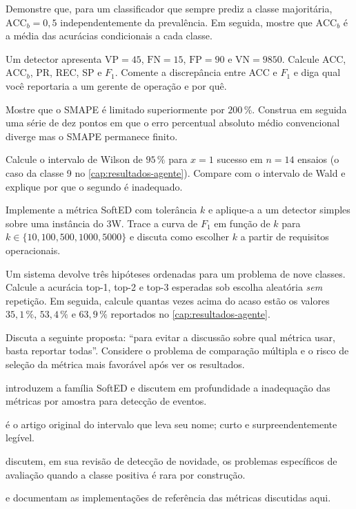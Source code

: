 \begin{exercicios}
\item Demonstre que, para um classificador que sempre prediz a classe majoritária,
      $\text{ACC}_b = 0{,}5$ independentemente da prevalência. Em seguida, mostre que
      $\text{ACC}_b$ é a média das acurácias condicionais a cada classe.

\item Um detector apresenta $\text{VP} = 45$, $\text{FN} = 15$, $\text{FP} = 90$ e
      $\text{VN} = \num{9850}$. Calcule ACC, $\text{ACC}_b$, PR, REC, SP e $F_1$.
      Comente a discrepância entre ACC e $F_1$ e diga qual você reportaria a um gerente
      de operação e por quê.

\item Mostre que o SMAPE é limitado superiormente por $200\,\%$. Construa em seguida uma
      série de dez pontos em que o erro percentual absoluto médio convencional diverge
      mas o SMAPE permanece finito.

\item Calcule o intervalo de Wilson de $95\,\%$ para $x = 1$ sucesso em $n = 14$ ensaios
      (o caso da classe 9 no \cref{cap:resultados-agente}). Compare com o intervalo de
      Wald e explique por que o segundo é inadequado.

\item Implemente a métrica SoftED com tolerância $k$ e aplique-a a um detector simples
      sobre uma instância do 3W. Trace a curva de $F_1$ em função de $k$ para
      $k \in \{10, 100, 500, 1000, 5000\}$ e discuta como escolher $k$ a partir de
      requisitos operacionais.

\item Um sistema devolve três hipóteses ordenadas para um problema de nove classes.
      Calcule a acurácia top-1, top-2 e top-3 esperadas sob escolha aleatória
      \emph{sem} repetição. Em seguida, calcule quantas vezes acima do acaso estão os
      valores $35{,}1\,\%$, $53{,}4\,\%$ e $63{,}9\,\%$ reportados no
      \cref{cap:resultados-agente}.

\item Discuta a seguinte proposta: ``para evitar a discussão sobre qual métrica usar,
      basta reportar todas''. Considere o problema de comparação múltipla e o risco de
      seleção da métrica mais favorável após ver os resultados.
\end{exercicios}

\begin{leituras}
\item \citet{Salles2024softed} introduzem a família SoftED e discutem em profundidade a
      inadequação das métricas por amostra para detecção de eventos.
\item \citet{Wilson1927} é o artigo original do intervalo que leva seu nome; curto e
      surpreendentemente legível.
\item \citet{Pimentel2014review} discutem, em sua revisão de detecção de novidade, os
      problemas específicos de avaliação quando a classe positiva é rara por
      construção.
\item \citet{Chollet2015} e \citet{scipy} documentam as implementações de referência das
      métricas discutidas aqui.
\end{leituras}
